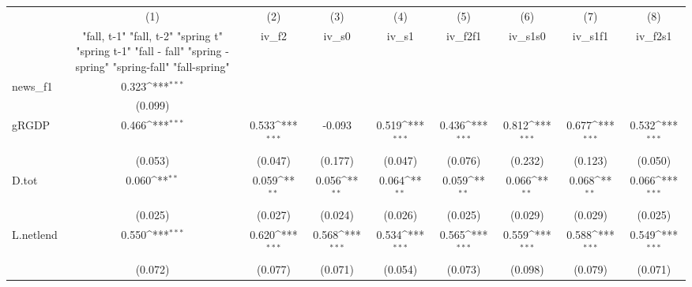 {
\def\sym#1{\ifmmode^{#1}\else\(^{#1}\)\fi}
\begin{tabular}{l*{8}{c}}
\toprule
            &\multicolumn{1}{c}{(1)}&\multicolumn{1}{c}{(2)}&\multicolumn{1}{c}{(3)}&\multicolumn{1}{c}{(4)}&\multicolumn{1}{c}{(5)}&\multicolumn{1}{c}{(6)}&\multicolumn{1}{c}{(7)}&\multicolumn{1}{c}{(8)}\\
            &\multicolumn{1}{c}{  "fall, t-1" "fall, t-2" "spring t" "spring t-1"  "fall - fall" "spring - spring" "spring-fall" "fall-spring" }&\multicolumn{1}{c}{iv\_f2}&\multicolumn{1}{c}{iv\_s0}&\multicolumn{1}{c}{iv\_s1}&\multicolumn{1}{c}{iv\_f2f1}&\multicolumn{1}{c}{iv\_s1s0}&\multicolumn{1}{c}{iv\_s1f1}&\multicolumn{1}{c}{iv\_f2s1}\\
\midrule
news\_f1     &       0.323\sym{***}&                     &                     &                     &                     &                     &                     &                     \\
            &     (0.099)         &                     &                     &                     &                     &                     &                     &                     \\
\addlinespace
gRGDP       &       0.466\sym{***}&       0.533\sym{***}&      -0.093         &       0.519\sym{***}&       0.436\sym{***}&       0.812\sym{***}&       0.677\sym{***}&       0.532\sym{***}\\
            &     (0.053)         &     (0.047)         &     (0.177)         &     (0.047)         &     (0.076)         &     (0.232)         &     (0.123)         &     (0.050)         \\
\addlinespace
D.tot       &       0.060\sym{**} &       0.059\sym{**} &       0.056\sym{**} &       0.064\sym{**} &       0.059\sym{**} &       0.066\sym{**} &       0.068\sym{**} &       0.066\sym{***}\\
            &     (0.025)         &     (0.027)         &     (0.024)         &     (0.026)         &     (0.025)         &     (0.029)         &     (0.029)         &     (0.025)         \\
\addlinespace
L.netlend   &       0.550\sym{***}&       0.620\sym{***}&       0.568\sym{***}&       0.534\sym{***}&       0.565\sym{***}&       0.559\sym{***}&       0.588\sym{***}&       0.549\sym{***}\\
            &     (0.072)         &     (0.077)         &     (0.071)         &     (0.054)         &     (0.073)         &     (0.098)         &     (0.079)         &     (0.071)         \\

\end{tabular}}
